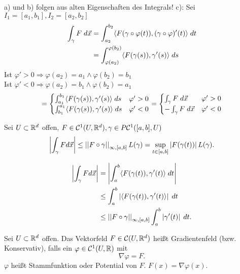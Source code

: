 \documentclass[../ana2.tex]{subfiles}
\begin{document}
\begin{bew}
    a) und b) folgen aus alten Eigenschaften des Integrals!
    c): Sei \(I_1 = [a_1,b_1], I_2 = [a_2,b_2]\)
    \begin{align*}
        \integralx{F}{\gamma}{}{\vec{x}} 
        &= \integralx{\scalarprod{F(\gamma \circ \varphi(t))}{(\gamma \circ \varphi)'(t)}}{a_2}{b_2}{t} \\
        &= \integralx{ \scalarprod{ F(\gamma(s)) }{ \gamma'(s) } }{\varphi(a_2)}{\varphi(b_2)}{s}
    \end{align*}
    Ist \(\varphi' > 0 \Rightarrow \varphi(a_2) = a_1 \wedge \varphi(b_2) = b_1\)\\
    Ist \(\varphi' < 0 \Rightarrow \varphi(a_2) = b_1 \wedge \varphi(b_2) = a_1\)
    \[ = \begin{cases}
        \integralx{\scalarprod{F(\gamma(s))}{\gamma'(s)}}{a_1}{b_1}{s} & \varphi' > 0 \\
    \integralx{\scalarprod{F(\gamma(s))}{\gamma'(s)}}{b_1}{a_1}{s} & \varphi' < 0 \\
    \end{cases} = \begin{cases}
        \int_\gamma F \; d\vec{x} & \varphi' > 0 \\
        - \int_\gamma F \; d\vec{x} & \varphi' < 0
    \end{cases} \]    
\end{bew}
\begin{lem}
    Sei \(U \subset \R^d\) offen, \(F \in \mathcal{C}^1(U, \R^d), \gamma \in P\mathcal{C}^1([a,b], U)\)
    \[ \abs{\int_\gamma F d\vec{x}} \leq \norm{F \circ \gamma}_{\infty,[a,b]} L(\gamma) 
    = \underset{t \in [a,b]}{\sup} \abs{F(\gamma(t))} L(\gamma).\]
\end{lem}
\begin{bew}
    \begin{align*}
        \abs{\int_\gamma F d\vec{x}} &= \abs{\integralx{\scalarprod{F(\gamma(t))}{\gamma'(t)}}{a}{b}{t}} \\
        &\leq \integralx{\abs{ \scalarprod{F(\gamma(t))}{\gamma'(t)}}}{a}{b}{t} \\
        &\leq \norm{F \circ \gamma}_{\infty, [a,b]} \integralx{\abs{\gamma'(t)}}{a}{b}{t}.
    \end{align*}
\end{bew}
\begin{defi}[Gradientenfeld]
    Sei \(U \subset \R^d\) offen. Das Vektorfeld \(F \in \mathcal{C}(U,\R^d)\)
    heißt Gradientenfeld (bzw. Konservativ),
    falls ein \(\varphi \in \mathcal{C}^1(U, \R)\) mit 
    \[ \nabla \varphi = F. \] 
    \(\varphi\) heißt Stammfunktion oder Potential von \(F\). 
    \( F(x) = \nabla \varphi (x) \).
\end{defi}
\end{document}
